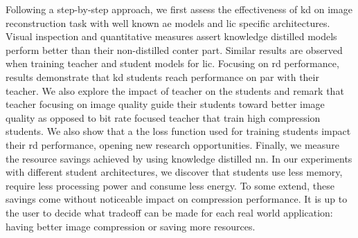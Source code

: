 Following a step-by-step approach, we first assess the effectiveness of \acrshort{kd} on image reconstruction task with well known \acrshort{ae} models and \acrshort{lic} specific architectures. Visual inspection and quantitative measures assert knowledge distilled models perform better than their non-distilled conter part. Similar results are observed when training teacher and student models for \acrshort{lic}. Focusing on \acrshort{rd} performance, results demonstrate that \acrshort{kd} students reach performance on par with their teacher. We also explore the impact of teacher on the students and remark that teacher focusing on image quality guide their students toward better image quality as opposed to bit rate focused teacher that train high compression students. We also show that a the loss function used for training students impact their \acrshort{rd} performance, opening new research opportunities. Finally, we measure the resource savings achieved by using knowledge distilled \acrshort{nn}. In our experiments with different student architectures, we discover that students use less memory, require less processing power and consume less energy. To some extend, these savings come without noticeable impact on compression performance. It is up to the user to decide what tradeoff can be made for each real world application: having better image compression or saving more resources.

